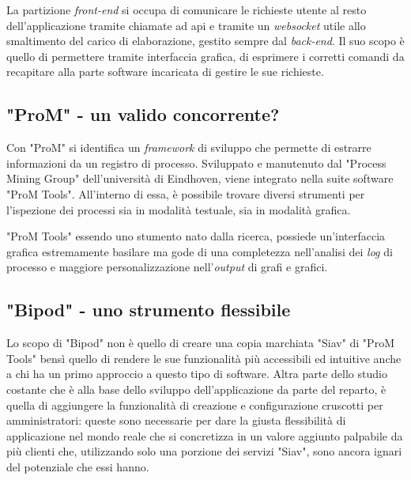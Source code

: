 La partizione \textit{front-end} si occupa di comunicare le richieste utente al resto dell'applicazione tramite chiamate ad \acrshort{api} e tramite un \textit{websocket} utile allo smaltimento del carico di elaborazione, gestito sempre dal \textit{back-end}. Il suo scopo è quello di permettere tramite interfaccia grafica, di esprimere i corretti comandi da recapitare alla parte software incaricata di gestire le sue richieste.
\newpage
\subsection{"ProM" - un valido concorrente?}
Con "ProM" si identifica un \textit{framework} di sviluppo che permette di estrarre informazioni da un registro di processo. Sviluppato e manutenuto dal "Process Mining Group" dell'università di Eindhoven, viene integrato nella suite software "ProM Tools". All'interno di essa, è possibile trovare diversi strumenti per l'ispezione dei processi sia in modalità testuale, sia in modalità grafica.

"ProM Tools" essendo uno stumento nato dalla ricerca, possiede un'interfaccia grafica estremamente basilare ma gode di una completezza nell'analisi dei \textit{log} di processo e maggiore personalizzazione nell'\textit{output} di grafi e grafici.
\subsection{"Bipod" - uno strumento flessibile}
Lo scopo di "Bipod" non è quello di creare una copia marchiata "Siav" di "ProM Tools" bensì quello di rendere le sue funzionalità più accessibili ed intuitive anche a chi ha un primo approccio a questo tipo di software.
Altra parte dello studio costante che è alla base dello sviluppo dell'applicazione da parte del reparto, è quella di aggiungere la funzionalità di creazione e configurazione cruscotti per amministratori: queste sono necessarie per dare la giusta flessibilità di applicazione nel mondo reale che si concretizza in un valore aggiunto palpabile da più clienti che, utilizzando solo una porzione dei servizi "Siav", sono ancora ignari del potenziale che essi hanno.

